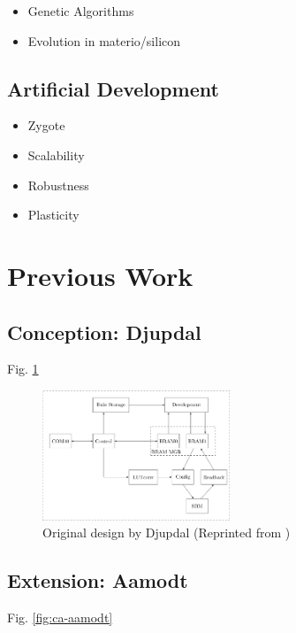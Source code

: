 \documentclass[a4paper]{IEEEtran}
\begin{document}
\begin{itemize}
    \item Genetic Algorithms
    \item Evolution in materio/silicon \cite{miller2014evolution}
\end{itemize}

\subsection{Artificial Development \cite{harding2008artificial}\cite{tufte2008evodevo}}
\begin{itemize}
    \item Zygote
    \item Scalability
    \item Robustness
    \item Plasticity
\end{itemize}

\section{Previous Work}

\subsection{Conception: Djupdal \cite{djupdal2003sblock}}

Fig. \ref{fig:ca-djupdal}

\begin{figure}[h!]
    \centering
    \includegraphics[width=0.5\textwidth]{figures/ca-djupdal}
    \caption{Original design by Djupdal (Reprinted from \cite{stovneng2014sblock})}
    \label{fig:ca-djupdal}
\end{figure}

\subsection{Extension: Aamodt \cite{aamodt2005sblock}}

Fig. \ref{fig:ca-aamodt}
\end{document}
